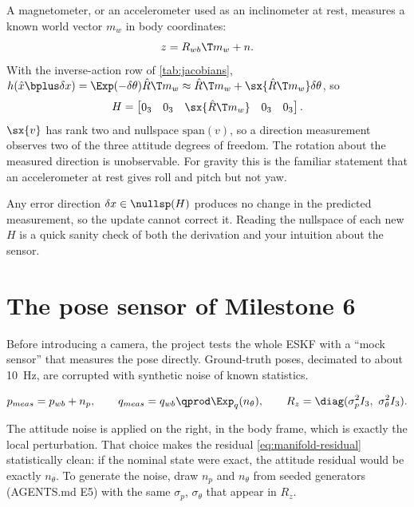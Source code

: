 A magnetometer, or an accelerometer used as an inclinometer at rest, measures a known world vector $m_w$ in
body coordinates:
\begin{equation}
  z = R_{wb}\T m_w + n .
\end{equation}
With the inverse-action row of \cref{tab:jacobians}, $h(\hat x\bplus\delta x) = \Exp(-\delta\theta)\hat R\T m_w \approx \hat R\T m_w +
\sx{\hat R\T m_w}\delta\theta$, so
\begin{equation}
  H = \begin{bmatrix} 0_3 & 0_3 & \sx{\hat R\T m_w} & 0_3 & 0_3 \end{bmatrix}.
\end{equation}
$\sx{v}$ has rank two and nullspace $\mathrm{span}(v)$, so a direction measurement observes two of the three attitude
degrees of freedom. The rotation about the measured direction is unobservable. For gravity this is the
familiar statement that an accelerometer at rest gives roll and pitch but not yaw.

\begin{keyidea}
Any error direction $\delta x \in \nullsp(H)$ produces no change in the predicted measurement, so the update cannot
correct it. Reading the nullspace of each new $H$ is a quick sanity check of both the derivation and your
intuition about the sensor.
\end{keyidea}

\section{The pose sensor of Milestone 6}

Before introducing a camera, the project tests the whole ESKF with a ``mock sensor'' that measures the pose
directly. Ground-truth poses, decimated to about 10~Hz, are corrupted with synthetic noise of known statistics.

\begin{convention}
\begin{equation}
  p_{meas} = p_{wb} + n_p, \qquad q_{meas} = q_{wb}\qprod\Exp_q(n_\theta), \qquad
  R_z = \diag(\sigma_p^2 I_3,\ \sigma_\theta^2 I_3).
\end{equation}
\end{convention}

The attitude noise is applied on the right, in the body frame, which is exactly the local perturbation. That
choice makes the residual \eqref{eq:manifold-residual} statistically clean: if the nominal state were exact, the
attitude residual would be exactly $n_\theta$. To generate the noise, draw $n_p$ and $n_\theta$ from seeded
 generators (AGENTS.md E5) with the same $\sigma_p$, $\sigma_\theta$ that appear in $R_z$.

